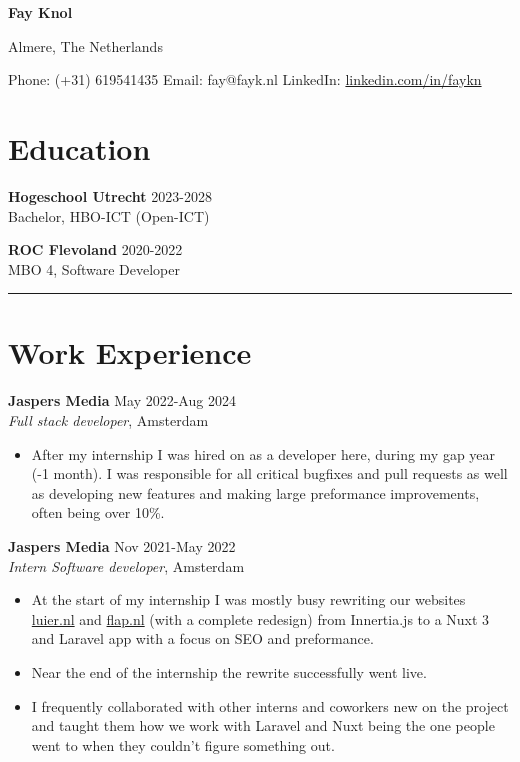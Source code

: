 \documentclass{article}
\begin{document}

\begin{center}
    \textbf{\Huge Fay Knol}

    \vspace{5pt}
    
    Almere, The Netherlands
    
    \vspace{5pt}
    
    Phone: (+31) 619541435 \quad Email: fay@fayk.nl \quad LinkedIn: \href{https://www.linkedin.com/in/faykn}{linkedin.com/in/faykn}
\end{center}

\noindent\makebox[\linewidth]{\rule{\paperwidth}{0.4pt}}

\section*{Education}
\textbf{Hogeschool Utrecht} \hfill 2023-2028 \\
Bachelor, HBO-ICT (Open-ICT) \hfill

\textbf{ROC Flevoland} \hfill 2020-2022 \\
MBO 4, Software Developer \hfill

\noindent\rule{\linewidth}{0.4pt}

\section*{Work Experience}
\textbf{Jaspers Media} \hfill May 2022-Aug 2024 \\
\textit{Full stack developer}, Amsterdam \hfill
\begin{itemize}[noitemsep]
    \item After my internship I was hired on as a developer here, during my gap year (-1 month).
        I was responsible for all critical bugfixes and pull requests as well as developing new features and making large preformance improvements, often being over 10\%.
\end{itemize}
\textbf{Jaspers Media} \hfill Nov 2021-May 2022 \\
\textit{Intern Software developer}, Amsterdam \hfill
\begin{itemize}[noitemsep]
    \item At the start of my internship I was mostly busy rewriting our websites \href{https://luier.nl}{luier.nl} and \href{https://flap.nl}{flap.nl} (with a complete redesign) from Innertia.js to a Nuxt 3 and Laravel app with a focus on SEO and preformance.
    \item Near the end of the internship the rewrite successfully went live.
    \item I frequently collaborated with other interns and coworkers new on the project and taught them how we work with Laravel and Nuxt being the one people went to when they couldn't figure something out.
\end{itemize}
\end{document}
